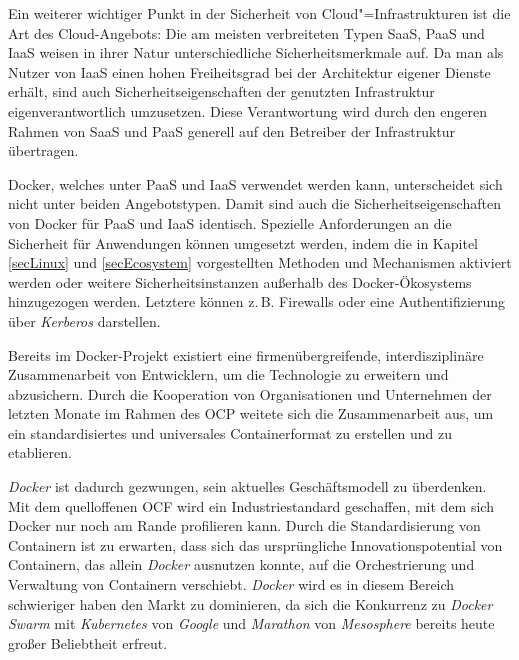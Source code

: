 \documentclass[../main.tex]{subfiles}
\begin{document}
  \clearpage

  Ein weiterer wichtiger Punkt in der Sicherheit von Cloud"=Infrastrukturen ist die Art des Cloud-Angebots: Die am meisten verbreiteten Typen SaaS, PaaS und IaaS weisen in ihrer Natur unterschiedliche Sicherheitsmerkmale auf. Da man als Nutzer von IaaS einen hohen Freiheitsgrad bei der Architektur eigener Dienste erhält, sind auch Sicherheitseigenschaften der genutzten Infrastruktur eigenverantwortlich umzusetzen. Diese Verantwortung wird durch den engeren Rahmen von SaaS und PaaS generell auf den Betreiber der Infrastruktur übertragen.

  Docker, welches unter PaaS und IaaS verwendet werden kann, unterscheidet sich nicht unter beiden Angebotstypen. Damit sind auch die Sicherheitseigenschaften von Docker für PaaS und IaaS identisch. Spezielle Anforderungen an die Sicherheit für Anwendungen können umgesetzt werden, indem die in Kapitel \ref{secLinux} und \ref{secEcosystem} vorgestellten Methoden und Mechanismen aktiviert werden oder weitere Sicherheitsinstanzen außerhalb des Docker-Ökosystems hinzugezogen werden. Letztere können z.\,B. Firewalls oder eine Authentifizierung über \emph{Kerberos} darstellen.



  Bereits im Docker-Projekt existiert eine firmenübergreifende, interdisziplinäre Zusammenarbeit von Entwicklern, um die Technologie zu erweitern und abzusichern. Durch die Kooperation von Organisationen und Unternehmen der letzten Monate im Rahmen des \acrshort{OCP} weitete sich die Zusammenarbeit aus, um ein standardisiertes und universales Containerformat zu erstellen und zu etablieren.

  \emph{Docker} ist dadurch gezwungen, sein aktuelles Geschäftsmodell zu überdenken. Mit dem quelloffenen OCF wird ein Industriestandard geschaffen, mit dem sich Docker nur noch am Rande profilieren kann. Durch die Standardisierung von Containern ist zu erwarten, dass sich das ursprüngliche Innovationspotential von Containern, das allein \emph{Docker} ausnutzen konnte, auf die Orchestrierung und Verwaltung von Containern verschiebt. \emph{Docker} wird es in diesem Bereich schwieriger haben den Markt zu dominieren, da sich die Konkurrenz zu \emph{Docker Swarm} mit \emph{Kubernetes} von \emph{Google} und \emph{Marathon} von \emph{Mesosphere} bereits heute großer Beliebtheit erfreut.
\end{document}
